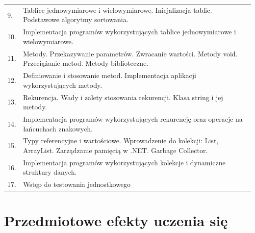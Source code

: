 \documentclass[12pt, a4paper]{article}
\begin{document}
{\begin{longtable}{m{1.5cm}m{14.5cm}}
  \rowcolor{tableRowLight} 9. & Tablice jednowymiarowe i wielowymiarowe. Inicjalizacja tablic. Podstawowe algorytmy sortowania. \\
  \rowcolor{tableRowAlt} 10. & Implementacja programów wykorzystujących tablice jednowymiarowe i wielowymiarowe. \\
  \rowcolor{tableRowLight} 11. & Metody. Przekazywanie parametrów. Zwracanie wartości. Metody void. Przeciążanie metod. Metody biblioteczne. \\
  \rowcolor{tableRowAlt} 12. & Definiowanie i stosowanie metod. Implementacja aplikacji wykorzystujących metody. \\
  \rowcolor{tableRowLight} 13. & Rekurencja. Wady i zalety stosowania rekurencji. Klasa string i jej metody. \\
  \rowcolor{tableRowAlt} 14. & Implementacja programów wykorzystujących rekurencję oraz operacje na łańcuchach znakowych. \\
  \rowcolor{tableRowLight} 15. & Typy referencyjne i wartościowe. Wprowadzenie do kolekcji: List, ArrayList. Zarządzanie pamięcią w .NET. Garbage Collector. \\
  \rowcolor{tableRowAlt} 16. & Implementacja programów wykorzystujących kolekcje i dynamiczne struktury danych. \\
  \rowcolor{tableRowLight} 17. & Wstęp do testowania jednostkowego \\
\bottomrule
\end{longtable}}

\section{Przedmiotowe efekty uczenia się}
\end{document}
